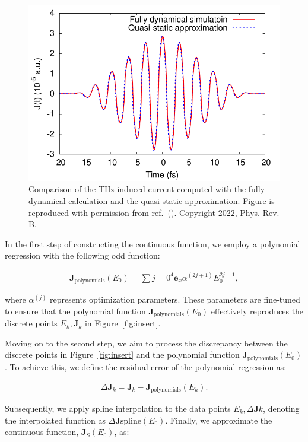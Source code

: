 \begin{figure}[htbp]
	\centering
	\includegraphics[width=0.8\linewidth]{pic/current_comparison_appendix.pdf}
	\caption{\label{fig:current} Comparison of the THz-induced current computed with the fully dynamical calculation and the quasi-static approximation. Figure is reproduced with permission from ref.~(\cite{PhysRevB.106.024313}). Copyright 2022, Phys. Rev. B.}
\end{figure}

In the first step of constructing the continuous function, we employ a polynomial regression with the following odd function:

\begin{align}
	\mathbf{J}_{\mathrm{polynomials }}(E_0)= \sum\limits{j=0}^{4} \mathbf e_x \alpha^{(2j+1)} E^{2j+1}_0,
	\label{eq:appendix-polynomial}
\end{align}

where $\alpha^{(j)}$ represents optimization parameters. These parameters are fine-tuned to ensure that the polynomial function $\mathbf{J}_{\mathrm{polynomials }}(E_0)$ effectively reproduces the discrete points ${E_k, \mathbf J_k}$ in Figure~\ref{fig:insert}.

Moving on to the second step, we aim to process the discrepancy between the discrete points in Figure~\ref{fig:insert} and the polynomial function $\mathbf{J}_{\mathrm{polynomials }}(E_0)$. To achieve this, we define the residual error of the polynomial regression as:

\begin{align}
	\Delta \mathbf{J}_k=\mathbf{J}_{k}-\mathbf{J}_{\mathrm{polynomials}}(E_k).
\end{align}

Subsequently, we apply spline interpolation to the data points ${E_k, \Delta \mathbf{J}k}$, denoting the interpolated function as $\Delta \mathbf{J}{\mathrm{spline}}(E_0)$. Finally, we approximate the continuous function, $\mathbf J_S(E_0)$, as:

